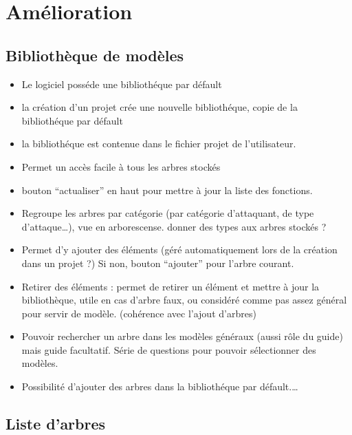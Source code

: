 \section{Amélioration}


	\subsection{Bibliothèque de modèles}

		\begin{itemize}
			\item Le logiciel posséde une bibliothéque par défault
			\item la création d'un projet crée une nouvelle bibliothéque, copie de la bibliothéque par défault
			\item la bibliothéque est contenue dans le fichier projet de l'utilisateur. 
			\item Permet un accès facile à tous les arbres stockés
			\item bouton “actualiser” en haut pour mettre à jour la liste des fonctions.
			\item Regroupe les arbres par catégorie (par catégorie d’attaquant, de type d’attaque…), vue en arborescense. 	donner des types aux arbres stockés ?
			\item Permet d’y ajouter des éléments (géré automatiquement lors de la création dans un projet ?) Si non, bouton “ajouter” pour l’arbre courant. 
			\item Retirer des éléments : permet de retirer un élément et mettre à jour la bibliothèque, utile en cas d’arbre faux, ou considéré comme pas assez général pour servir de modèle. (cohérence avec l’ajout d’arbres)
			\item Pouvoir rechercher un arbre dans les modèles généraux (aussi rôle du guide) mais guide facultatif. Série de questions pour pouvoir sélectionner des modèles.
			\item Possibilité d'ajouter des arbres dans la bibliothéque par défault.\ldots
		\end{itemize}
		

	\subsection{Liste d'arbres}

